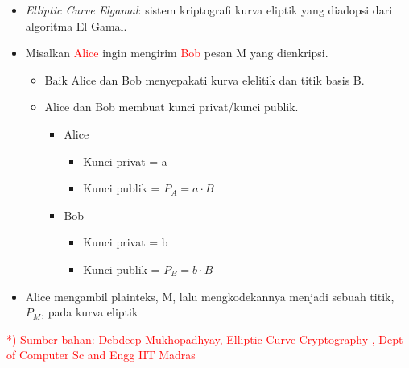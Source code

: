 \documentclass{article}
\begin{document}
\begin{itemize}
    \item \textit{Elliptic Curve Elgamal}: sistem kriptografi kurva eliptik yang diadopsi dari algoritma El Gamal.
    \item Misalkan \textcolor{red}{Alice} ingin mengirim \textcolor{red}{Bob} pesan M yang dienkripsi.
    \begin{itemize}
        \item Baik Alice dan Bob menyepakati kurva elelitik dan titik basis B.
        \item Alice dan Bob membuat kunci privat/kunci publik.
        \begin{itemize}
            \item Alice
            \begin{itemize}
                \item Kunci privat = a
                \item Kunci publik = $P_A = a \cdot B$
            \end{itemize}
            \item Bob
            \begin{itemize}
                \item Kunci privat = b
                \item Kunci publik = $P_B = b \cdot B$
            \end{itemize}
        \end{itemize}
    \end{itemize}
    \item Alice mengambil plainteks, M, lalu mengkodekannya menjadi sebuah titik, $P_M$, pada kurva eliptik
\end{itemize}

\vspace{5mm}

\textcolor{red}{*) Sumber bahan: Debdeep Mukhopadhyay, Elliptic Curve Cryptography , Dept of Computer Sc and Engg IIT Madras}

\newpage

\end{document}
